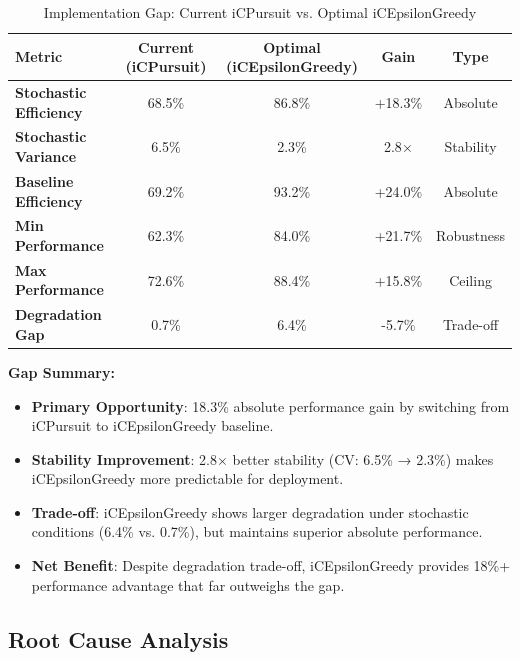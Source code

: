 \documentclass[12pt,a4paper]{article}
\newcommand{\success}[1]{\textcolor{accentgreen}{\textbf{#1}}}
\newcommand{\warning}[1]{\textcolor{warningred}{\textbf{#1}}}
\begin{document}
\begin{table}[H]
\centering
\caption{Implementation Gap: Current iCPursuit vs. Optimal iCEpsilonGreedy}
\label{tab:implementation-gap}
\begin{tabular}{@{}lcccc@{}}
\toprule
\textbf{Metric} & \textbf{Current (iCPursuit)} & \textbf{Optimal (iCEpsilonGreedy)} & \textbf{Gain} & \textbf{Type} \\
\midrule
\warning{Stochastic Efficiency} & 68.5\% & 86.8\% & +18.3\% & Absolute \\
\warning{Stochastic Variance} & 6.5\% & 2.3\% & 2.8$\times$ & Stability \\
\warning{Baseline Efficiency} & 69.2\% & 93.2\% & +24.0\% & Absolute \\
\warning{Min Performance} & 62.3\% & 84.0\% & +21.7\% & Robustness \\
\warning{Max Performance} & 72.6\% & 88.4\% & +15.8\% & Ceiling \\
\midrule
\warning{Degradation Gap} & 0.7\% & 6.4\% & -5.7\% & Trade-off \\
\bottomrule
\end{tabular}
\end{table}

\textbf{Gap Summary:}
\begin{itemize}
\item \warning{Primary Opportunity}: 18.3\% absolute performance gain by switching from iCPursuit to iCEpsilonGreedy baseline.
\item \warning{Stability Improvement}: 2.8$\times$ better stability (CV: 6.5\% → 2.3\%) makes iCEpsilonGreedy more predictable for deployment.
\item \warning{Trade-off}: iCEpsilonGreedy shows larger degradation under stochastic conditions (6.4\% vs. 0.7\%), but maintains superior absolute performance.
\item \success{Net Benefit}: Despite degradation trade-off, iCEpsilonGreedy provides 18\%+ performance advantage that far outweighs the gap.
\end{itemize}

\subsection{Root Cause Analysis}
\end{document}
